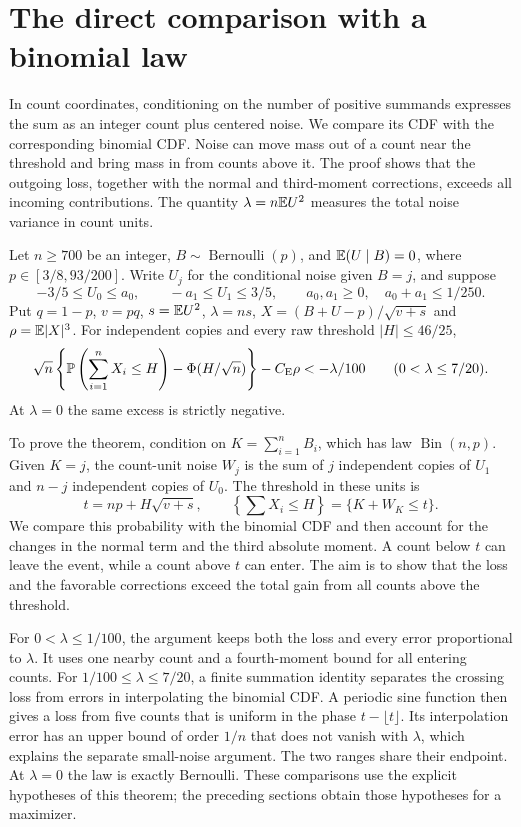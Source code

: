\section{The direct comparison with a binomial law}
\label{short:count:section}

In count coordinates, conditioning on the number of positive summands
expresses the sum as an integer count plus centered noise. We compare its CDF with the corresponding
binomial CDF. Noise can move mass out of a count near the threshold
and bring mass in from counts above it. The proof shows that the outgoing
loss, together with the normal and third-moment corrections, exceeds all
incoming contributions. The quantity $\lambda=n\mathbb E U^2$ measures the total
noise variance in count units.

\begin{theorem}\label{short:count:local}
Let $n\ge700$ be an integer, $B\sim\operatorname{Bernoulli}(p)$, and
$\mathbb E(U\mid B)=0$, where $p\in[3/8,93/200]$. Write $U_j$ for the conditional
noise given $B=j$, and suppose
\[
 -3/5\le U_0\le a_0,\qquad -a_1\le U_1\le3/5,
 \qquad a_0,a_1\ge0,\quad a_0+a_1\le1/250.
\]
Put $q=1-p$, $v=pq$, $s=\mathbb E U^2$, $\lambda=ns$,
$X=(B+U-p)/\sqrt{v+s}$ and $\rho=\mathbb E|X|^3$. For independent copies and
every raw threshold $|H|\le46/25$,
\begin{equation}\label{short:count:exclusion}
 \sqrt n\left\{\mathbb P\left(\sum_{i=1}^nX_i\le H\right)
                  -\Phi(H/\sqrt n)\right\}-C_{\mathrm E}\rho
 < -\lambda/100\qquad(0<\lambda\le7/20).
\end{equation}
At $\lambda=0$ the same excess is strictly negative.
\end{theorem}

To prove the theorem, condition on $K=\sum_{i=1}^nB_i$, which has law
$\operatorname{Bin}(n,p)$. Given $K=j$, the count-unit noise $W_j$ is the
sum of $j$ independent copies of $U_1$ and $n-j$ independent copies of
$U_0$. The threshold in these units is
\[
 t=np+H\sqrt{v+s},\qquad
 \left\{\sum X_i\le H\right\}=\{K+W_K\le t\}.
\]
We compare this probability with the binomial CDF and then account for
the changes in the normal term and the third absolute moment.
A count below $t$ can leave the event, while a count above $t$ can enter.
The aim is to show that the loss and the favorable corrections exceed
the total gain from all counts above the threshold.

For $0<\lambda\le1/100$, the argument keeps both the loss and every
error proportional to $\lambda$. It uses one nearby count
and a fourth-moment bound for all entering counts. For
$1/100\le\lambda\le7/20$, a finite summation identity separates the
crossing loss from errors in interpolating the binomial CDF. A periodic
sine function then gives a loss from five counts that is uniform in the
phase $t-\lfloor t\rfloor$. Its interpolation error has an upper bound
of order $1/n$ that does not vanish with $\lambda$, which explains the
separate small-noise argument. The two ranges share their endpoint.
At $\lambda=0$ the law is exactly Bernoulli. These comparisons use the
explicit hypotheses of this theorem; the preceding sections obtain
those hypotheses for a maximizer.


